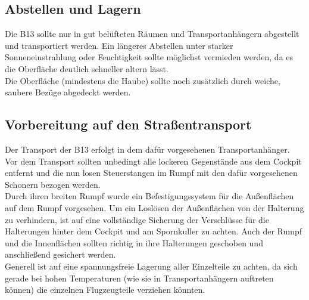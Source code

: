 \subsection{Abstellen und Lagern}
Die B13 sollte nur in gut belüfteten Räumen und Transportanhängern abgestellt und transportiert werden. Ein längeres Abstellen unter starker Sonneneinstrahlung oder Feuchtigkeit sollte möglichst vermieden werden, da es die Oberfläche deutlich schneller altern lässt.\\
\newline
Die Oberfläche (mindestens die Haube) sollte noch zusätzlich durch weiche, saubere Bezüge abgedeckt werden. 

\subsection{Vorbereitung auf den Straßentransport}
Der Transport der B13 erfolgt in dem dafür vorgesehenen Transportanhänger. Vor dem Transport sollten unbedingt alle lockeren Gegenstände aus dem Cockpit entfernt und die nun losen Steuerstangen im Rumpf mit den dafür vorgesehenen Schonern bezogen werden. \\
\newline
Durch ihren breiten Rumpf wurde ein Befestigungssystem für die Außenflächen auf dem Rumpf vorgesehen. Um ein Loslösen der Außenflächen von der Halterung zu verhindern, ist auf eine vollständige Sicherung der Verschlüsse für die Halterungen hinter dem Cockpit und am Spornkuller zu achten. Auch der Rumpf und die Innenflächen sollten richtig in ihre Halterungen geschoben und anschließend gesichert werden. \\
\newline
Generell ist auf eine spannungsfreie Lagerung aller Einzelteile zu achten, da sich gerade bei hohen Temperaturen (wie sie in Transportanhängern auftreten können)  die einzelnen Flugzeugteile verziehen könnten. 

